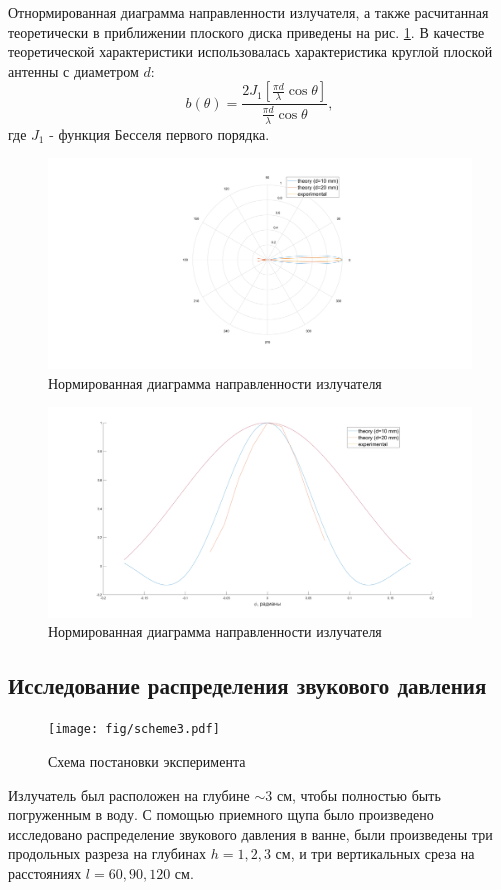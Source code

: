 Отнормированная диаграмма направленности излучателя, а также расчитанная теоретически в приближении плоского диска
приведены на рис. \ref{fig:direct1}. В качестве теоретической характеристики использовалась характеристика круглой
плоской антенны с диаметром $d$:
\begin{equation}
	b(\theta) = \frac{2 J_1[ \frac{\pi d}{\lambda} \cos \theta ]}{\frac{\pi d}{\lambda} \cos \theta },
	\label{eq:bessel_disk}
\end{equation}
где $J_1$ - функция Бесселя первого порядка.
\begin{figure}[H]
	\centering
	\includegraphics[width=\linewidth]{pic/diag1.png}
	\caption{Нормированная диаграмма направленности излучателя}
	\label{fig:direct1}
\end{figure}
\begin{figure}[H]
	\centering
	\includegraphics[width=\linewidth]{pic/diag2.png}
	\caption{Нормированная диаграмма направленности излучателя}
	\label{fig:direct2}
\end{figure}

\subsection{Исследование распределения звукового давления}
\begin{figure}[h!]
	\centering
	\texttt{[image: fig/scheme3.pdf]}
	\caption{Схема постановки эксперимента}
	\label{fig:expt:scheme3}
\end{figure}
Излучатель был расположен на глубине $\sim 3$ см, чтобы полностью быть погруженным в воду.
С помощью приемного щупа было произведено исследовано распределение звукового давления в ванне, были произведены три
продольных разреза на глубинах $h = 1,2,3$ см, и три вертикальных среза на расстояниях $l=60,90,120$ см.

